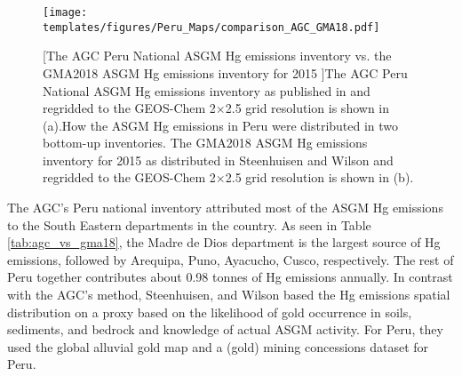 \begin{figure}[H]
\centering
  \texttt{[image: templates/figures/Peru\_Maps/comparison\_AGC\_GMA18.pdf]}  

[The AGC Peru National ASGM Hg emissions inventory vs. the GMA2018 ASGM Hg emissions inventory for 2015 ]{The AGC Peru National ASGM Hg emissions inventory as published in \cite{agc_reporte_2017} and regridded to the GEOS-Chem 2$\times$2.5 grid resolution is shown in (a).How the ASGM Hg emissions in Peru were distributed in two bottom-up inventories. The GMA2018 ASGM Hg emissions inventory for 2015 as distributed in Steenhuisen and Wilson \cite{steenhuisen_development_2019} and regridded  to the GEOS-Chem 2$\times$2.5 grid resolution is shown in (b).}
\label{fig:agc_vs_gma18}
\end{figure}
\FloatBarrier
\begin{flushleft}
The AGC's Peru national inventory attributed most of the ASGM Hg emissions to the South Eastern departments in the country\cite{agc_reporte_2017}. As seen in Table \ref{tab:agc_vs_gma18}, the Madre de Dios department is the largest source of Hg emissions, followed by Arequipa, Puno, Ayacucho, Cusco, respectively. The rest of Peru together contributes about 0.98 tonnes of Hg emissions annually. In contrast with the AGC's method, Steenhuisen, and Wilson\cite{steenhuisen_development_2019} based the Hg emissions spatial distribution on a proxy based on the likelihood of gold occurrence in soils, sediments, and bedrock and knowledge of actual ASGM activity. For Peru, they used the global alluvial gold map and a (gold) mining concessions dataset for Peru.
\end{flushleft}


